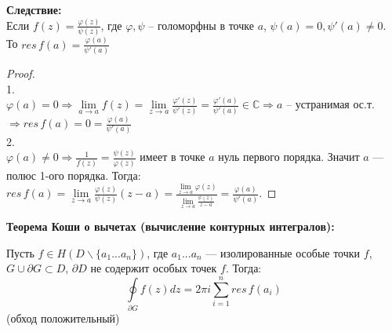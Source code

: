 \textbf{Следствие:}\\
Если $f(z)=\frac{\varphi(z)}{\psi(z)}$, где $\varphi, \psi$ -- голоморфны в точке $a$, $\psi(a)=0, \psi'(a)\neq 0$.\\
То $res\,f(a)=\frac{\varphi(a)}{\psi'(a)}$

\begin{proof}
    \ \\
    1.\\
    $\varphi(a)=0 \Rightarrow \lim\limits_{a\to a}f(z) = \lim\limits_{z\to a} \frac{\varphi'(z)}{\psi'(z)}=\frac{\varphi'(a)}{\psi'(a)} \in \mathbb{C} \Rightarrow a$ -- устранимая ос.т. $\Rightarrow res\,f(a)=0=\frac{\varphi(a)}{\psi'(a)}$\\
    2.\\
    $\varphi(a)\neq 0\Rightarrow \frac{1}{f(z)}=\frac{\psi(z)}{\varphi(z)}$ имеет в точке $a$ нуль первого порядка. Значит $a$ --- полюс 1-ого порядка. Тогда:\\
    $res\,f(a)=\lim\limits_{z\to a}\frac{\varphi(z)}{\psi(z)}(z-a)=\frac{\lim\limits_{z\to a}\varphi(z)}{\lim\limits_{z\to a}\frac{\psi(z)}{z-a}}=\frac{\varphi(a)}{\psi'(a)}$.
\end{proof}




\textbf{Теорема Коши о вычетах (вычисление контурных интегралов):}

Пусть $f \in H(D \backslash \{a_1 ... a_n\})$, где $a_1 ... a_n$ --- изолированные особые точки $f$,
$G \cup \partial G \subset D$, $\partial D$ не содержит особых точек $f$. Тогда:
$$
\oint\limits_{\partial G}f(z)dz = 2\pi i \sum_{i = 1}^{n} res\, f(a_i)
$$
(обход положительный)
\\

